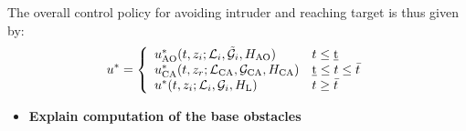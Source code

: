 




The overall control policy for avoiding intruder and reaching target is thus given by:
\begin{equation*}
u^* = 
\left \{ 
\begin{array}{ll}
u^*_\text{AO}(t, z_i; \mathcal{L}_i, \tilde{\mathcal{G}}_i, H_\text{AO}) & t \leq \underbar{t}\\
u^*_\text{CA}(t, z_r; \mathcal{L}_\text{CA}, \mathcal{G}_\text{CA}, H_\text{CA}) & \underbar{t} \leq t \leq \bar{t} \\
u^*(t, z_i; \mathcal{L}_i, \mathcal{G}_i, H_\text{L}) & t \geq \bar{t}
\end{array}
\right.
\end{equation*}

\begin{itemize}
\item \textbf{Explain computation of the base obstacles}
\end{itemize}

